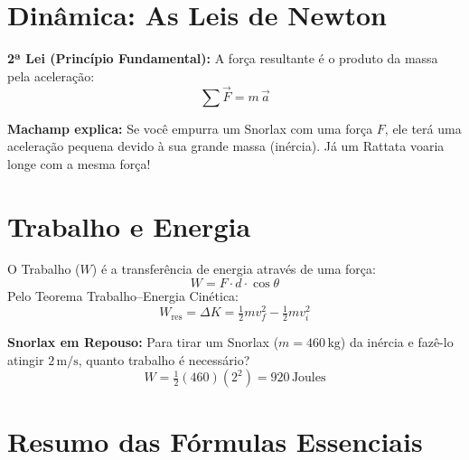 \documentclass[10.5pt, a4paper]{extarticle}
\begin{document}
\section{Dinâmica: As Leis de Newton}

\begin{definicaobox}
\textbf{2ª Lei (Princípio Fundamental):} A força resultante é o produto da massa pela aceleração:
\[
  \sum\vec{F} = m\,\vec{a}
\]
\end{definicaobox}

\begin{pikabox}
\textbf{Machamp explica:} Se você empurra um Snorlax com uma força $F$, ele terá uma aceleração pequena devido à sua grande massa (inércia). Já um Rattata voaria longe com a mesma força!
\end{pikabox}

\section{Trabalho e Energia}

\begin{squirtlebox}
O Trabalho ($W$) é a transferência de energia através de uma força:
\[
  W = F \cdot d \cdot \cos\theta
\]
Pelo Teorema Trabalho--Energia Cinética:
\[
  W_{\text{res}} = \Delta K = \tfrac{1}{2}mv_f^2 - \tfrac{1}{2}mv_i^2
\]
\end{squirtlebox}

\begin{bulbabox}
\textbf{Snorlax em Repouso:} Para tirar um Snorlax ($m=460\,\text{kg}$) da inércia e fazê-lo atingir $2\,\text{m/s}$, quanto trabalho é necessário?
\[
  W = \tfrac{1}{2}(460)(2^2) = 920\,\text{Joules}
\]
\end{bulbabox}

\section{Resumo das Fórmulas Essenciais}
\end{document}
